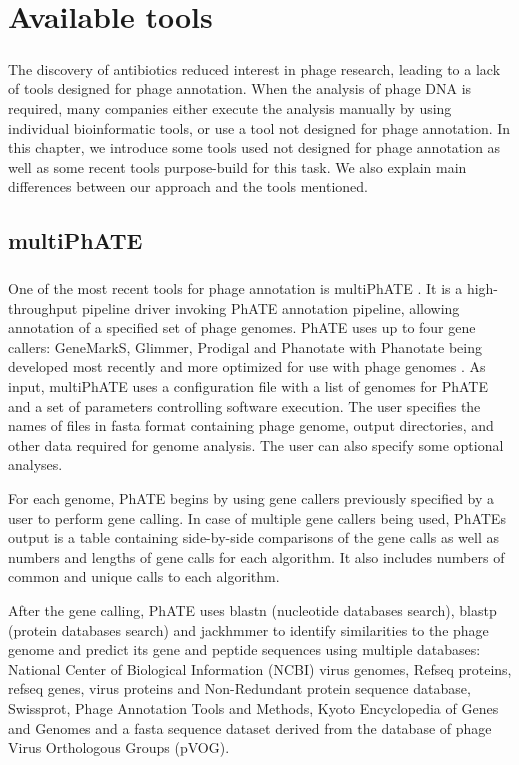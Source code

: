 \chapter{Available tools}

\label{kap:avtools} %
\paragraph*{}
The discovery of antibiotics reduced interest in phage research, leading to a lack of tools designed for phage annotation. When the analysis of phage DNA is required, many companies either execute the analysis manually by using individual bioinformatic tools, or use a tool not designed for phage annotation. In this chapter, we introduce some tools used not designed for phage annotation as well as some recent tools purpose-build for this task. We also explain main differences between our approach and the tools mentioned.
\section{multiPhATE}
\paragraph*{}
One of the most recent tools for phage annotation is multiPhATE \cite{10.1093/bioinformatics/btz258}. It is a high-throughput pipeline driver invoking PhATE annotation pipeline, allowing annotation of a specified set of phage genomes. PhATE uses up to four gene callers: GeneMarkS, Glimmer, Prodigal and Phanotate with Phanotate being developed most recently and more optimized for use with phage genomes \cite{10.1093/bioinformatics/btz265}.
As input, multiPhATE uses a configuration file with a list of genomes for PhATE and a set of parameters controlling software execution. The user specifies the names of files in fasta format containing phage genome, output directories, and other data required for genome analysis. The user can also specify some optional analyses.

For each genome, PhATE begins by using gene callers previously specified by a user to perform gene calling. In case of multiple gene callers being used, PhATEs output is a table containing side-by-side comparisons of the gene calls as well as numbers and lengths of gene calls for each algorithm. It also includes numbers of common and unique calls to each algorithm. 

After the gene calling, PhATE uses blastn (nucleotide databases search), blastp (protein databases search) and jackhmmer to identify similarities to the phage genome and predict its gene and peptide sequences using multiple databases: National Center of Biological Information (NCBI) virus genomes, Refseq proteins, refseq genes, virus proteins and Non-Redundant protein sequence database, Swissprot, Phage Annotation Tools and Methods, Kyoto Encyclopedia of Genes and Genomes and a fasta sequence dataset derived from the database of phage Virus Orthologous Groups (pVOG).

